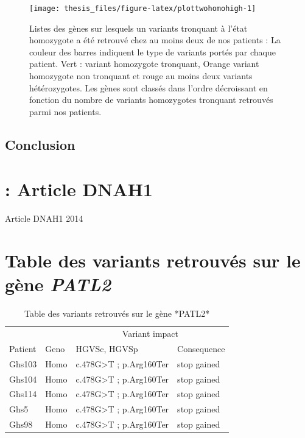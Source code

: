 \documentclass[12pt,twoside]{reedthesis}
\theoremstyle{definition}
\theoremstyle{definition}
\theoremstyle{remark}
\begin{document}
  \newpage
  
  \begin{figure}
  
  {\centering \texttt{[image: thesis\_files/figure-latex/plottwohomohigh-1]} 
  
  }
  
  \caption[Listes des gènes sur lesquels un variants tronquant à l'état homozygote a été retrouvé chez au moins deux de nos patients]{Listes des gènes sur lesquels un variants tronquant à l'état homozygote a été retrouvé chez au moins deux de nos patients : La couleur des barres indiquent le type de variants portés par chaque patient. Vert : variant homozygote tronquant, Orange variant homozygote non tronquant et rouge au moins deux variants hétérozygotes. Les gènes sont classés dans l'ordre décroissant en fonction du nombre de variants homozygotes tronquant retrouvés parmi nos patients.}\label{fig:plottwohomohigh}
  \end{figure}
  
  \newpage
  
  \section{Conclusion}\label{conclusion}
  
  \appendix
  
  \chapter{: Article DNAH1}\label{article-dnah1}
  
  Article DNAH1 2014
  
  \newpage
  
  \chapter{\texorpdfstring{Table des variants retrouvés sur le gène
  \emph{PATL2}}{Table des variants retrouvés sur le gène PATL2}}\label{table-des-variants-retrouves-sur-le-gene-patl2}
  
  \begin{longtable}[t]{llll}
  \caption{\label{tab:tabpatl2}Table des variants retrouvés sur le gène *PATL2*}\\
  \toprule
  \multicolumn{2}{c}{ } & \multicolumn{2}{c}{Variant impact} \\
  \cmidrule(l{2pt}r{2pt}){3-4}
  Patient & Geno & HGVSc, HGVSp & Consequence\\
  \midrule
  Ghs103 & Homo & c.478G>T ; p.Arg160Ter & stop gained\\
  Ghs104 & Homo & c.478G>T ; p.Arg160Ter & stop gained\\
  Ghs114 & Homo & c.478G>T ; p.Arg160Ter & stop gained\\
  Ghs5 & Homo & c.478G>T ; p.Arg160Ter & stop gained\\
  Ghs98 & Homo & c.478G>T ; p.Arg160Ter & stop gained\\
  \bottomrule
  \end{longtable}
  
\end{document}
